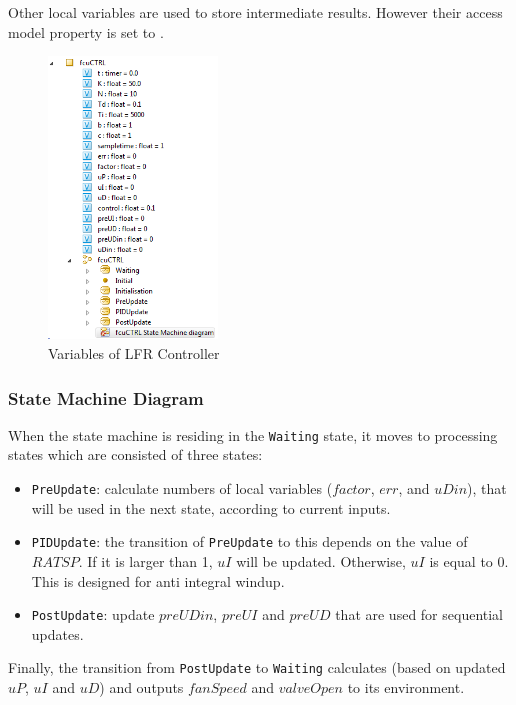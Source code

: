 Other local variables are used to store intermediate results. However their access model property is set to .

\begin{figure}[htb!]
    \centering
    \includegraphics[width=0.4\textwidth]{fcu_sut_vars}
    \caption{Variables of LFR Controller}
    \label{fig:fcu-var}
\end{figure}


\subsubsection{State Machine Diagram}
When the state machine is residing in the \verb+Waiting+ state, it moves to processing states which are consisted of three states:
\begin{itemize}
    \item \verb+PreUpdate+: calculate numbers of local variables ($factor$, $err$, and $uDin$), that will be used in the next state, according to current inputs.
    \item \verb+PIDUpdate+: the transition of \verb+PreUpdate+ to this depends on the value of $RATSP$. If it is larger than 1, $uI$ will be updated. Otherwise, $uI$ is equal to 0. This is designed for anti integral windup.
    \item \verb+PostUpdate+: update $preUDin$, $preUI$ and $preUD$ that are used for sequential updates. 
\end{itemize}
Finally, the transition from \verb+PostUpdate+ to \verb+Waiting+ calculates (based on updated $uP$, $uI$ and $uD$) and outputs $fanSpeed$ and $valveOpen$ to its environment.

